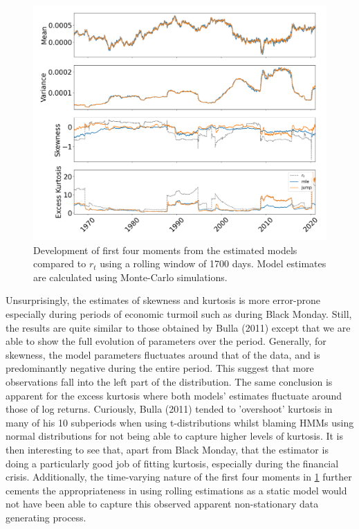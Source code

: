 \begin{figure}[H] 
    \centering
    \includegraphics[width=1.0\textwidth]{analysis/stylized_facts/images/moments_regular.png}
    \caption[Development of the first four moments from the estimated models and $r_t$]{Development of first four moments from the estimated models compared to $r_t$ using a rolling window of 1700 days. Model estimates are calculated using Monte-Carlo simulations.}
    \label{fig:stylized_facts_rolling_moments} 
\end{figure}

Unsurprisingly, the estimates of skewness and kurtosis is more error-prone especially during periods of economic turmoil such as during Black Monday. Still, the results are quite similar to those obtained by Bulla (2011) except that we are able to show the full evolution of parameters over the period. Generally, for skewness, the model parameters fluctuates around that of the data, and is predominantly negative during the entire period. This suggest that more observations fall into the left part of the distribution. The same conclusion is apparent for the excess kurtosis where both models' estimates fluctuate around those of log returns. Curiously, Bulla (2011) tended to 'overshoot' kurtosis in many of his 10 subperiods when using t-distributions whilst blaming HMMs using normal distributions for not being able to capture higher levels of kurtosis. It is then interesting to see that, apart from Black Monday, that the \jump estimator is doing a particularly good job of fitting kurtosis, especially during the financial crisis. Additionally, the time-varying nature of the first four moments in \cref{fig:stylized_facts_rolling_moments} further cements the appropriateness in using rolling estimations as a static model would not have been able to capture this observed apparent non-stationary data generating process.

